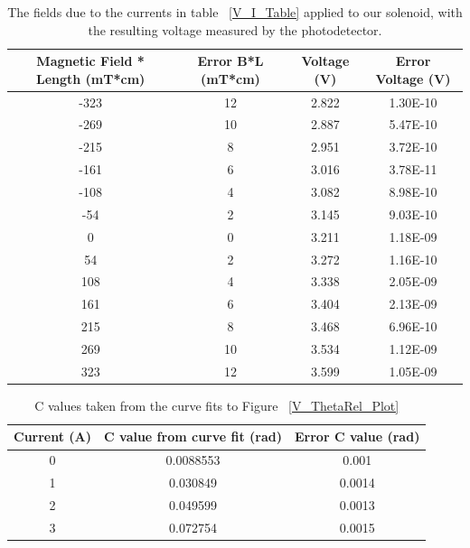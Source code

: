 \documentclass[prb,preprint]{revtex4-1}
\begin{document}
\begin{table}[h!]
\centering
\caption{The fields due to the currents in table ~\ref{V_I_Table} applied to our solenoid, with the resulting voltage measured by the photodetector. }
\begin{ruledtabular}
\begin{tabular}{c c c c}
Magnetic Field * Length (mT*cm) & Error B*L (mT*cm) & Voltage (V) & Error Voltage (V)\\
\hline	%
-323 & 12 & 2.822 & 1.30E-10 \\
-269 & 10 & 2.887 & 5.47E-10 \\
-215 & 8  & 2.951 & 3.72E-10 \\
-161 & 6  & 3.016 & 3.78E-11 \\
-108 & 4  & 3.082 & 8.98E-10 \\
-54  & 2  & 3.145 & 9.03E-10 \\
0    & 0  & 3.211 & 1.18E-09 \\
54   & 2  & 3.272 & 1.16E-10 \\
108  & 4  & 3.338 & 2.05E-09 \\
161  & 6  & 3.404 & 2.13E-09 \\
215  & 8  & 3.468 & 6.96E-10 \\
269  & 10 & 3.534 & 1.12E-09 \\
323  & 12 & 3.599 & 1.05E-09
\end{tabular}
\end{ruledtabular}
\label{V_B*L_Table}
\end{table}

\begin{table}[h!]
\centering
\caption{C values taken from the curve fits to Figure ~\ref{V_ThetaRel_Plot}}
\begin{ruledtabular}
\begin{tabular}{c c c}
Current (A) & C value from curve fit (rad) & Error C value (rad)\\
\hline	%
0 & 0.0088553 & 0.001  \\
1 & 0.030849  & 0.0014 \\
2 & 0.049599  & 0.0013 \\
3 & 0.072754  & 0.0015
\end{tabular}
\end{ruledtabular}
\label{I_cValue_Table}
\end{table}
\end{document}
